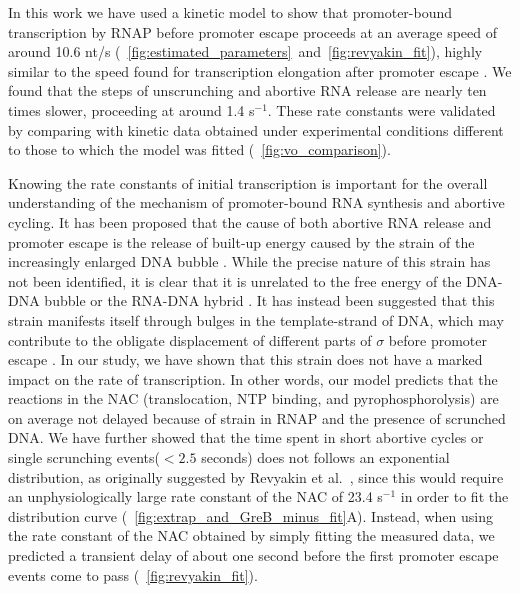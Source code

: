 %
In this work we have used a kinetic model to show that promoter-bound
transcription by RNAP before promoter escape proceeds at an average speed of
around 10.6 nt/s
(\FIGS~\ref{fig:estimated_parameters}~and~\ref{fig:revyakin_fit}), highly
similar to the speed found for transcription elongation after promoter escape
\cite{revyakin_abortive_2006}. We found that the steps of unscrunching and
abortive RNA release are nearly ten times slower, proceeding at around 1.4
s$^{-1}$. These rate constants were validated by comparing with kinetic data
obtained under experimental conditions different to those to which the model
was fitted (\FIG~\ref{fig:vo_comparison}).

Knowing the rate constants of initial transcription is important for the
overall understanding of the mechanism of promoter-bound RNA synthesis and
abortive cycling. It has been proposed that the cause of both abortive RNA
release and promoter escape is the release of built-up energy caused by the
strain of the increasingly enlarged DNA bubble \cite{straney_stressed_1987,
hsu_promoter_2002, revyakin_abortive_2006}. While the precise nature of this
strain has not been identified, it is clear that it is unrelated to the free
energy of the DNA-DNA bubble or the RNA-DNA hybrid \cite{hsu_initial_2006,
skancke_sequence-dependent_2015}. It has instead been suggested that this
strain manifests itself through bulges in the template-strand of DNA, which
may contribute to the obligate displacement of different parts of $\sigma$
before promoter escape \cite{winkelman_crosslink_2015}. In our study, we have
shown that this strain does not have a marked impact on the rate of
transcription. In other words, our model predicts that the reactions in the
NAC (translocation, NTP binding, and pyrophosphorolysis) are on average not
delayed because of strain in RNAP and the presence of scrunched DNA. We have
further showed that the time spent in short abortive cycles or single
scrunching events($< 2.5$ seconds) does not follows an exponential
distribution, as originally suggested by Revyakin et al.\
\cite{revyakin_abortive_2006}, since this would require an unphysiologically
large rate constant of the NAC of 23.4 s$^{-1}$ in order to fit the
distribution curve (\FIG~\ref{fig:extrap_and_GreB_minus_fit}A). Instead, when
using the rate constant of the NAC obtained by simply fitting the measured
data, we predicted a transient delay of about one second before the first
promoter escape events come to pass (\FIG~\ref{fig:revyakin_fit}).

